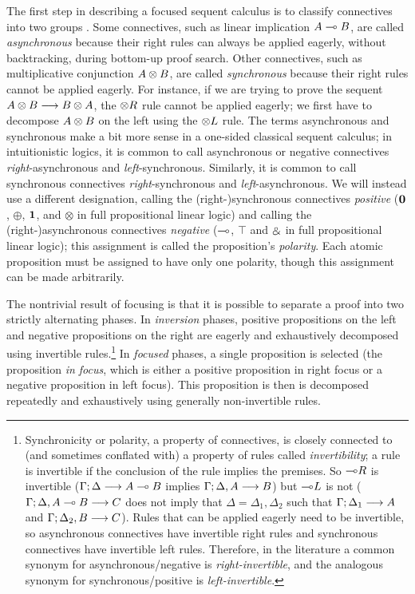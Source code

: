 The first step in describing a focused sequent calculus is to classify
connectives into two groups \cite{andreoli92logic}.  Some connectives,
such as linear implication $A \multimap B$, are called {\it asynchronous}
because their right rules can always be applied eagerly, without
backtracking, during bottom-up proof search. Other connectives, such
as multiplicative conjunction $A \otimes B$, are called {\it
  synchronous} because their right rules cannot be applied
eagerly. For instance, if we are trying to prove the sequent $A
\otimes B \longrightarrow B \otimes A$, the ${\otimes}R$ rule cannot
be applied eagerly; we first have to decompose $A \otimes B$ on the
left using the ${\otimes}L$ rule.  The terms asynchronous and
synchronous make a bit more sense in a one-sided classical sequent
calculus; in intuitionistic logics, it is common to call asynchronous
or negative connectives {\it right}-asynchronous and {\it
  left}-synchronous. Similarly, it is common to call synchronous
connectives {\it right}-synchronous and {\it left}-asynchronous.  We
will instead use a different designation, calling the
(right-)synchronous connectives {\it positive} ($\mathbf{0}$, $\oplus$,
$\mathbf{1}$, and $\otimes$ in full propositional linear logic) and calling
the (right-)asynchronous connectives {\it negative} ($\multimap$, $\top$
and $\mathbin{\binampersand}$ in full propositional linear logic); this assignment is
called the proposition's {\it polarity}. Each atomic proposition must
be assigned to have only one polarity, though this assignment can be
made arbitrarily.

The nontrivial result of focusing is that it is possible to separate a
proof into two strictly alternating phases. In {\it inversion} phases,
positive propositions on the left and negative propositions on the
right are eagerly and exhaustively decomposed using invertible
rules.\footnote{Synchronicity or polarity, a property of connectives,
  is closely connected to (and sometimes conflated with) a property of
  rules called {\it invertibility}; a rule is invertible if the
  conclusion of the rule implies the premises. So ${\multimap}R$ is
  invertible (${\Gamma};{\Delta} \longrightarrow {A \multimap B} \mathstrut$ implies
  ${\Gamma};{\Delta, A} \longrightarrow {B} \mathstrut$) but ${\multimap}L$ is not
  (${\Gamma};{\Delta, A \multimap B} \longrightarrow {C} \mathstrut$ does not imply that $\Delta =
  \Delta_1, \Delta_2$ such that ${\Gamma};{\Delta_1} \longrightarrow {A} \mathstrut$ and
  ${\Gamma};{\Delta_2, B} \longrightarrow {C} \mathstrut$).  Rules that can be applied eagerly
  need to be invertible, so asynchronous connectives have invertible
  right rules and synchronous connectives have invertible left
  rules. Therefore, in the literature a common synonym for
  asynchronous/negative is {\it right-invertible}, and the analogous
  synonym for synchronous/positive is {\it left-invertible}.}  In {\it
  focused} phases, a single proposition is selected (the proposition
{\it in focus}, which is either a positive proposition in right focus
or a negative proposition in left focus). This
proposition is then is decomposed repeatedly and
exhaustively using generally non-invertible rules.

